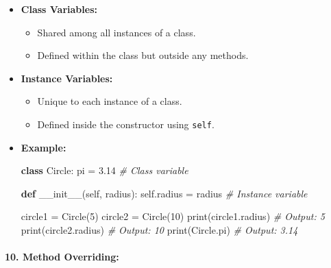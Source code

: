 \documentclass[11pt]{article}
\providecommand{\tightlist}{%
      \setlength{\itemsep}{0pt}\setlength{\parskip}{0pt}}
\newenvironment{Shaded}{}{}
\newcommand{\KeywordTok}[1]{\textcolor[rgb]{0.00,0.44,0.13}{\textbf{{#1}}}}
\newcommand{\DecValTok}[1]{\textcolor[rgb]{0.25,0.63,0.44}{{#1}}}
\newcommand{\FloatTok}[1]{\textcolor[rgb]{0.25,0.63,0.44}{{#1}}}
\newcommand{\CommentTok}[1]{\textcolor[rgb]{0.38,0.63,0.69}{\textit{{#1}}}}
\newcommand{\FunctionTok}[1]{\textcolor[rgb]{0.02,0.16,0.49}{{#1}}}
\newcommand{\NormalTok}[1]{{#1}}
\newcommand{\VariableTok}[1]{\textcolor[rgb]{0.10,0.09,0.49}{{#1}}}
\newcommand{\OperatorTok}[1]{\textcolor[rgb]{0.40,0.40,0.40}{{#1}}}
\newcommand{\BuiltInTok}[1]{{#1}}
\begin{document}
\begin{itemize}
\item
  \textbf{Class Variables:}

  \begin{itemize}
  \tightlist
  \item
    Shared among all instances of a class.
  \item
    Defined within the class but outside any methods.
  \end{itemize}
\item
  \textbf{Instance Variables:}

  \begin{itemize}
  \tightlist
  \item
    Unique to each instance of a class.
  \item
    Defined inside the constructor using \texttt{self}.
  \end{itemize}
\item
  \textbf{Example:}

\begin{Shaded}
\begin{Highlighting}[]
\KeywordTok{class}\NormalTok{ Circle:}
\NormalTok{    pi }\OperatorTok{=} \FloatTok{3.14}  \CommentTok{# Class variable}

    \KeywordTok{def} \FunctionTok{__init__}\NormalTok{(}\VariableTok{self}\NormalTok{, radius):}
        \VariableTok{self}\NormalTok{.radius }\OperatorTok{=}\NormalTok{ radius  }\CommentTok{# Instance variable}

\NormalTok{circle1 }\OperatorTok{=}\NormalTok{ Circle(}\DecValTok{5}\NormalTok{)}
\NormalTok{circle2 }\OperatorTok{=}\NormalTok{ Circle(}\DecValTok{10}\NormalTok{)}
\BuiltInTok{print}\NormalTok{(circle1.radius)  }\CommentTok{# Output: 5}
\BuiltInTok{print}\NormalTok{(circle2.radius)  }\CommentTok{# Output: 10}
\BuiltInTok{print}\NormalTok{(Circle.pi)  }\CommentTok{# Output: 3.14}
\end{Highlighting}
\end{Shaded}
\end{itemize}

\paragraph{\texorpdfstring{10. \textbf{Method
Overriding:}}{10. Method Overriding:}}\label{method-overriding}
\end{document}
